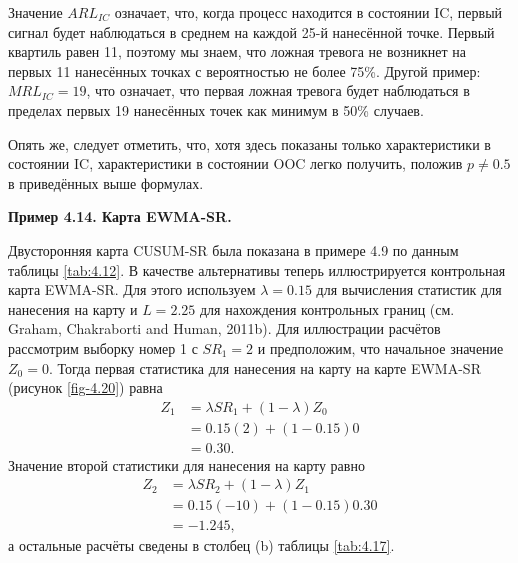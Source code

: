 Значение \(ARL_{IC}\) означает, что, когда процесс находится в состоянии IC, первый сигнал будет наблюдаться в среднем на каждой 25-й нанесённой точке. Первый квартиль равен 11, поэтому мы знаем, что ложная тревога не возникнет на первых 11 нанесённых точках с вероятностью не более 75\%. Другой пример: \(MRL_{IC} = 19\), что означает, что первая ложная тревога будет наблюдаться в пределах первых 19 нанесённых точек как минимум в 50\% случаев.

Опять же, следует отметить, что, хотя здесь показаны только характеристики в состоянии IC, характеристики в состоянии OOC легко получить, положив \(p \ne 0.5\) в приведённых выше формулах.

\noindent\textbf{Пример 4.14. Карта EWMA-SR.}

Двусторонняя карта CUSUM-SR была показана в примере 4.9 по данным таблицы \ref{tab:4.12}. В качестве альтернативы теперь иллюстрируется контрольная карта EWMA-SR. Для этого используем \(\lambda = 0.15\) для вычисления статистик для нанесения на карту и \(L = 2.25\) для нахождения контрольных границ (см. Graham, Chakraborti and Human, 2011b). Для иллюстрации расчётов рассмотрим выборку номер 1 с \(SR_1 = 2\) и предположим, что начальное значение \(Z_0 = 0\). Тогда первая статистика для нанесения на карту на карте EWMA-SR (рисунок \ref{fig-4.20}) равна
\begin{align*}
	Z_1 &= \lambda SR_1 + (1 - \lambda)Z_0 \\
	    &= 0.15(2) + (1 - 0.15)0 \\
	    &= 0.30.
\end{align*}
Значение второй статистики для нанесения на карту равно
\begin{align*}
	Z_2 &= \lambda SR_2 + (1 - \lambda)Z_1 \\
	    &= 0.15(-10) + (1 - 0.15)0.30 \\
	    &= -1.245,
\end{align*}
а остальные расчёты сведены в столбец (b) таблицы \ref{tab:4.17}.


